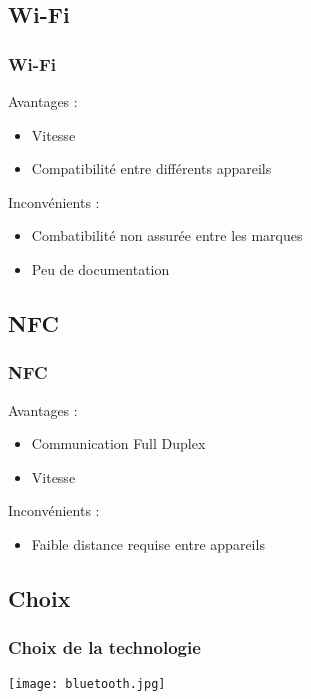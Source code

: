 \documentclass{beamer}
\begin{document}
      \subsection{Wi-Fi}
      \begin{frame}
	  \frametitle{Wi-Fi}
	  \begin{block}{Avantages :}
	  \begin{itemize}
	   \item Vitesse
	   \item Compatibilité entre différents appareils
	  \end{itemize}
	  \end{block}
	  \begin{block}{Inconvénients :}
	  \begin{itemize}
	   \item Combatibilité non assurée entre les marques
	   \item Peu de documentation
	  \end{itemize}
	  \end{block}
      \end{frame}
      \subsection{NFC}
      \begin{frame}
	  \frametitle{NFC}
	  \begin{block}{Avantages :}
	  \begin{itemize}
	   \item Communication Full Duplex
	   \item Vitesse
	  \end{itemize}
	  \end{block}
	  \begin{block}{Inconvénients :}
	  \begin{itemize}
	   \item Faible distance requise entre appareils
	  \end{itemize}
	  \end{block}
      \end{frame}
      \subsection{Choix}
      \begin{frame}
	  \frametitle{Choix de la technologie}
	  \begin{center}
	     \texttt{[image: bluetooth.jpg]}
      \end{center}
      \end{frame}
\end{document}
